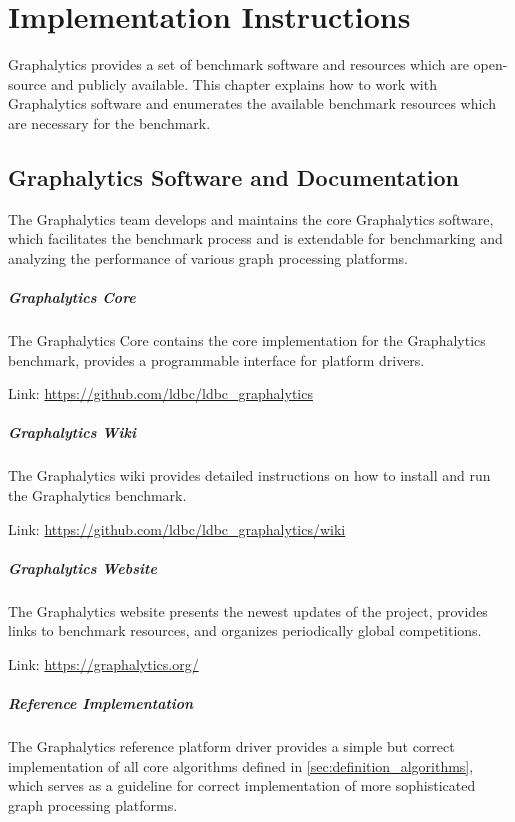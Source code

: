 \chapter{Implementation Instructions}
\label{chap:instructions}
Graphalytics provides a set of benchmark software and resources which are open-source and publicly available. This chapter explains how to work with Graphalytics software and enumerates the available benchmark resources which are necessary for the benchmark.



\section{Graphalytics Software and Documentation}\label{sec:instructions:core}
The Graphalytics team develops and maintains the core Graphalytics software, which facilitates the benchmark process and is extendable for benchmarking and analyzing the performance of various graph processing platforms.

\paragraph{Graphalytics Core} The Graphalytics Core contains the core implementation for the Graphalytics benchmark, provides a programmable interface for platform drivers.

\quad Link: \url{https://github.com/ldbc/ldbc_graphalytics}


\paragraph{Graphalytics Wiki} The Graphalytics wiki provides detailed instructions on how to install and run the Graphalytics benchmark.

\quad Link: \url{https://github.com/ldbc/ldbc_graphalytics/wiki}


\paragraph{Graphalytics Website} The Graphalytics website presents the newest updates of the project, provides links to benchmark resources, and organizes periodically global competitions.

\quad Link: \url{https://graphalytics.org/}


\paragraph{Reference Implementation} The Graphalytics reference platform driver provides a simple but correct implementation of all core algorithms defined in \autoref{sec:definition_algorithms}, which serves as a guideline for correct implementation of more sophisticated graph processing platforms.

